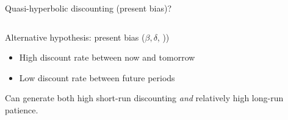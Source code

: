 \documentclass[aspectratio=169, 10pt, handout]{beamer}
\newenvironment{wideitemize}{\itemize\addtolength{\itemsep}{10pt}}{\enditemize}
\begin{document}
\begin{frame}{Quasi-hyperbolic discounting (present bias)?}

\begin{columns}[T] %

\begin{column}{.43\textwidth}
  
\vspace{0.4cm}

\begin{wideitemize}

	\item Alternative hypothesis: present bias ($\beta, \delta$,  \cite{laibson1997golden}))
	
	\begin{itemize}
	
		\item High discount rate between now and tomorrow

		\item Low discount rate between future periods

	\end{itemize}
	
	\pause
	
	\item Can generate both high short-run discounting \textit{and} relatively high long-run patience.

\end{wideitemize}

\end{column}%

\begin{column}{.63\textwidth}
\end{column}%
\hfill%


\end{columns}
\end{frame}
\end{document}

